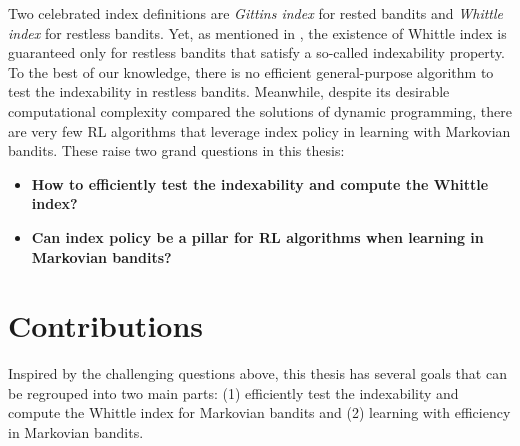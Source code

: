Two celebrated index definitions are \emph{Gittins index} \cite{gittins1979bandit} for rested bandits and \emph{Whittle index} \cite{whittle1988restless} for restless bandits.
Yet, as mentioned in \cite[Chapter~14]{whittle1996optimal}, the existence of Whittle index is guaranteed only for restless bandits that satisfy a so-called indexability property.
To the best of our knowledge, there is no efficient general-purpose algorithm to test the indexability in restless bandits.
Meanwhile, despite its desirable computational complexity compared the solutions of dynamic programming, there are very few RL algorithms that leverage index policy in learning with Markovian bandits.
These raise two grand questions in this thesis:
\begin{itemize}
    \item {\color{myblue}\bfseries\large How to efficiently test the indexability and compute the Whittle index?}
    \item {\color{myblue}\bfseries\large Can index policy be a pillar for RL algorithms when learning in Markovian bandits?}
\end{itemize}

\section{Contributions}

Inspired by the challenging questions above, this thesis has several goals that can be regrouped into two main parts: (1) efficiently test the indexability and compute the Whittle index for Markovian bandits and (2) learning with efficiency in Markovian bandits.


